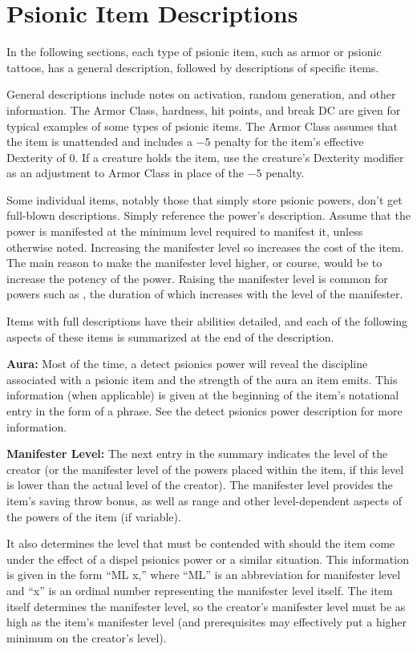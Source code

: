 \section{Psionic Item Descriptions}
In the following sections, each type of psionic item, such as armor or psionic tattoos, has a general description, followed by descriptions of specific items.

General descriptions include notes on activation, random generation, and other information. The Armor Class, hardness, hit points, and break DC are given for typical examples of some types of psionic items. The Armor Class assumes that the item is unattended and includes a $-5$ penalty for the item's effective Dexterity of 0. If a creature holds the item, use the creature's Dexterity modifier as an adjustment to Armor Class in place of the $-5$ penalty.

Some individual items, notably those that simply store psionic powers, don't get full-blown descriptions. Simply reference the power's description. Assume that the power is manifested at the minimum level required to manifest it, unless otherwise noted. Increasing the manifester level so increases the cost of the item. The main reason to make the manifester level higher, or course, would be to increase the potency of the power. Raising the manifester level is common for powers such as , the duration of which increases with the level of the manifester.

Items with full descriptions have their abilities detailed, and each of the following aspects of these items is summarized at the end of the description.

\textbf{Aura:} Most of the time, a detect psionics power will reveal the discipline associated with a psionic item and the strength of the aura an item emits. This information (when applicable) is given at the beginning of the item's notational entry in the form of a phrase. See the detect psionics power description for more information.

\textbf{Manifester Level:} The next entry in the summary indicates the level of the creator (or the manifester level of the powers placed within the item, if this level is lower than the actual level of the creator). The manifester level provides the item's saving throw bonus, as well as range and other level-dependent aspects of the powers of the item (if variable).

It also determines the level that must be contended with should the item come under the effect of a dispel psionics power or a similar situation. This information is given in the form ``ML x,'' where ``ML'' is an abbreviation for manifester level and ``x'' is an ordinal number representing the manifester level itself. The item itself determines the manifester level, so the creator's manifester level must be as high as the item's manifester level (and prerequisites may effectively put a higher minimum on the creator's level).

